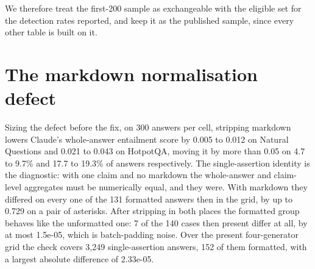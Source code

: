 \documentclass[11pt]{article}
\begin{document}
We therefore treat the first-200 sample as exchangeable with the eligible set for the detection rates reported, and keep it as the published sample, since every other table is built on it.


\section{The markdown normalisation defect}
\label{app:markdown}

Sizing the defect before the fix, on 300 answers per cell, stripping markdown lowers Claude's whole-answer entailment score by 0.005 to 0.012 on Natural Questions and 0.021 to 0.043 on HotpotQA, moving it by more than 0.05 on 4.7 to 9.7\% and 17.7 to 19.3\% of answers respectively. The single-assertion identity is the diagnostic: with one claim and no markdown the whole-answer and claim-level aggregates must be numerically equal, and they were. With markdown they differed on every one of the 131 formatted answers then in the grid, by up to 0.729 on a pair of asterisks. After stripping in both places the formatted group behaves like the unformatted one: 7 of the 140 cases then present differ at all, by at most 1.5e-05, which is batch-padding noise. Over the present four-generator grid the check covers 3,249 single-assertion answers, 152 of them formatted, with a largest absolute difference of 2.33e-05.
\fi

\ifnum{}
  
  
  
  
  
  
  
\fi
\ifnum{}
\ifnum{}
  
\fi
\end{document}
